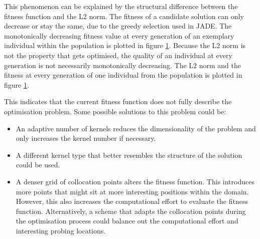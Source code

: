 \documentclass[./\jobname.tex]{subfiles}
\begin{document}
This phenomenon can be explained by the structural difference between the fitness function and the L2 norm. The fitness of a candidate solution can only decrease or stay the same, due to the greedy selection used in JADE. The monotonically decreasing fitness value at every generation of an exemplary individual within the population is plotted in figure \ref{fig:ex0_pde5_gak_fit_vs_l2}. Because the L2 norm is not the property that gets optimised, the quality of an individual at every generation is not necessarily monotonically decreasing. The L2 norm and the fitness at every generation of one individual from the population is plotted in figure \ref{fig:ex0_pde5_gak_fit_vs_l2}.
\begin{figure}[H]
	\centering
	\noindent{}
	\label{fig:ex0_pde5_gak_fit_vs_l2}
\end{figure}
This indicates that the current fitness function does not fully describe the optimisation problem. Some possible solutions to this problem could be:
\begin{itemize}
	\item An adaptive number of kernels reduces the dimensionality of the problem and only increases the kernel number if necessary. 
	\item A different kernel type that better resembles the structure of the solution could be used. 
	\item A denser grid of collocation points alters the fitness function. This introduces more points that might sit at more interesting positions within the domain. However, this also increases the computational effort to evaluate the fitness function. Alternatively, a scheme that adapts the collocation points during the optimisation process could balance out the computational effort and interesting probing locations.
\end{itemize}
\end{document}
